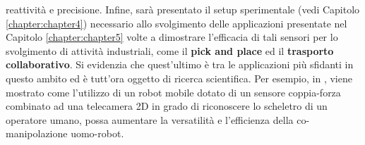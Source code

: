 reattivit\`{a} e precisione. Infine, sar\`{a} presentato il setup sperimentale (vedi Capitolo \ref{chapter:chapter4}) necessario 
allo svolgimento delle applicazioni presentate nel Capitolo \ref{chapter:chapter5} volte a dimostrare l'efficacia
di tali sensori per lo svolgimento di attivit\`{a} industriali, come il \textbf{pick and place} ed il \textbf{trasporto collaborativo}. 
Si evidenzia che quest'ultimo \`{e} tra le applicazioni pi\`{u} sfidanti in questo ambito ed \`{e} tutt'ora oggetto di ricerca scientifica. 
Per esempio, in \cite{de2021towards}, viene mostrato come l'utilizzo di un robot mobile dotato 
di un sensore coppia-forza combinato ad una telecamera 2D in grado di riconoscere lo scheletro di un operatore umano, possa 
aumentare la versatilit\`{a} e l'efficienza della co-manipolazione uomo-robot.
